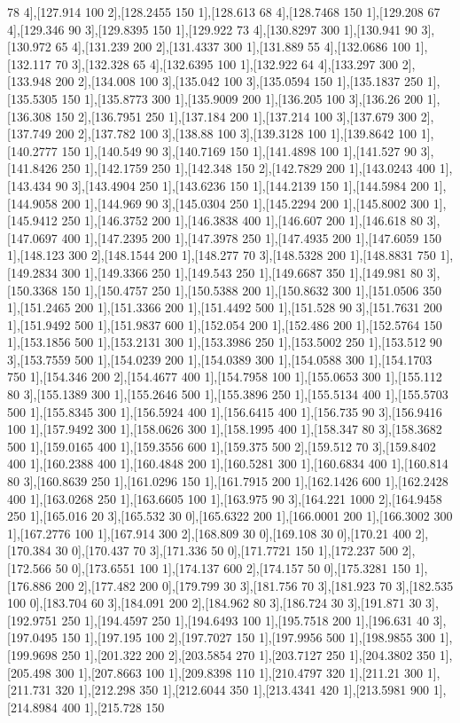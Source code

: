 {78 4],[127.914 100 2],[128.2455 150 1],[128.613 68 4],[128.7468 150 1],[129.208 67 4],[129.346 90 3],[129.8395 150 1],[129.922 73 4],[130.8297 300 1],[130.941 90 3],[130.972 65 4],[131.239 200 2],[131.4337 300 1],[131.889 55 4],[132.0686 100 1],[132.117 70 3],[132.328 65 4],[132.6395 100 1],[132.922 64 4],[133.297 300 2],[133.948 200 2],[134.008 100 3],[135.042 100 3],[135.0594 150 1],[135.1837 250 1],[135.5305 150 1],[135.8773 300 1],[135.9009 200 1],[136.205 100 3],[136.26 200 1],[136.308 150 2],[136.7951 250 1],[137.184 200 1],[137.214 100 3],[137.679 300 2],[137.749 200 2],[137.782 100 3],[138.88 100 3],[139.3128 100 1],[139.8642 100 1],[140.2777 150 1],[140.549 90 3],[140.7169 150 1],[141.4898 100 1],[141.527 90 3],[141.8426 250 1],[142.1759 250 1],[142.348 150 2],[142.7829 200 1],[143.0243 400 1],[143.434 90 3],[143.4904 250 1],[143.6236 150 1],[144.2139 150 1],[144.5984 200 1],[144.9058 200 1],[144.969 90 3],[145.0304 250 1],[145.2294 200 1],[145.8002 300 1],[145.9412 250 1],[146.3752 200 1],[146.3838 400 1],[146.607 200 1],[146.618 80 3],[147.0697 400 1],[147.2395 200 1],[147.3978 250 1],[147.4935 200 1],[147.6059 150 1],[148.123 300 2],[148.1544 200 1],[148.277 70 3],[148.5328 200 1],[148.8831 750 1],[149.2834 300 1],[149.3366 250 1],[149.543 250 1],[149.6687 350 1],[149.981 80 3],[150.3368 150 1],[150.4757 250 1],[150.5388 200 1],[150.8632 300 1],[151.0506 350 1],[151.2465 200 1],[151.3366 200 1],[151.4492 500 1],[151.528 90 3],[151.7631 200 1],[151.9492 500 1],[151.9837 600 1],[152.054 200 1],[152.486 200 1],[152.5764 150 1],[153.1856 500 1],[153.2131 300 1],[153.3986 250 1],[153.5002 250 1],[153.512 90 3],[153.7559 500 1],[154.0239 200 1],[154.0389 300 1],[154.0588 300 1],[154.1703 750 1],[154.346 200 2],[154.4677 400 1],[154.7958 100 1],[155.0653 300 1],[155.112 80 3],[155.1389 300 1],[155.2646 500 1],[155.3896 250 1],[155.5134 400 1],[155.5703 500 1],[155.8345 300 1],[156.5924 400 1],[156.6415 400 1],[156.735 90 3],[156.9416 100 1],[157.9492 300 1],[158.0626 300 1],[158.1995 400 1],[158.347 80 3],[158.3682 500 1],[159.0165 400 1],[159.3556 600 1],[159.375 500 2],[159.512 70 3],[159.8402 400 1],[160.2388 400 1],[160.4848 200 1],[160.5281 300 1],[160.6834 400 1],[160.814 80 3],[160.8639 250 1],[161.0296 150 1],[161.7915 200 1],[162.1426 600 1],[162.2428 400 1],[163.0268 250 1],[163.6605 100 1],[163.975 90 3],[164.221 1000 2],[164.9458 250 1],[165.016 20 3],[165.532 30 0],[165.6322 200 1],[166.0001 200 1],[166.3002 300 1],[167.2776 100 1],[167.914 300 2],[168.809 30 0],[169.108 30 0],[170.21 400 2],[170.384 30 0],[170.437 70 3],[171.336 50 0],[171.7721 150 1],[172.237 500 2],[172.566 50 0],[173.6551 100 1],[174.137 600 2],[174.157 50 0],[175.3281 150 1],[176.886 200 2],[177.482 200 0],[179.799 30 3],[181.756 70 3],[181.923 70 3],[182.535 100 0],[183.704 60 3],[184.091 200 2],[184.962 80 3],[186.724 30 3],[191.871 30 3],[192.9751 250 1],[194.4597 250 1],[194.6493 100 1],[195.7518 200 1],[196.631 40 3],[197.0495 150 1],[197.195 100 2],[197.7027 150 1],[197.9956 500 1],[198.9855 300 1],[199.9698 250 1],[201.322 200 2],[203.5854 270 1],[203.7127 250 1],[204.3802 350 1],[205.498 300 1],[207.8663 100 1],[209.8398 110 1],[210.4797 320 1],[211.21 300 1],[211.731 320 1],[212.298 350 1],[212.6044 350 1],[213.4341 420 1],[213.5981 900 1],[214.8984 400 1],[215.728 150 }
